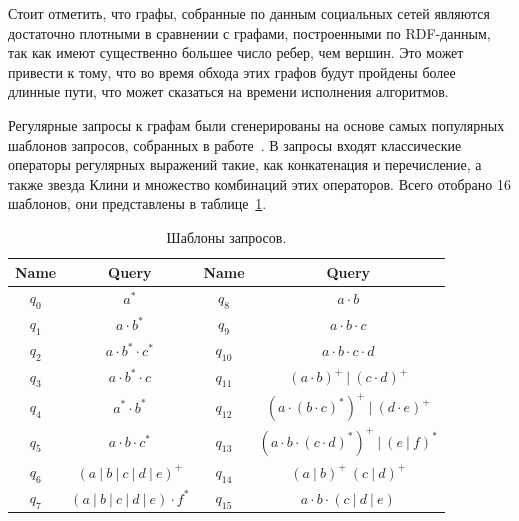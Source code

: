 Стоит отметить, что графы, собранные по данным социальных сетей являются достаточно плотными в сравнении с графами, построенными по RDF-данным, так как имеют существенно большее число ребер, чем вершин. Это может привести к тому, что во время обхода этих графов будут пройдены более длинные пути, что может сказаться на времени исполнения алгоритмов.

Регулярные запросы к графам были сгенерированы на основе самых популярных шаблонов запросов, собранных в  работе~\cite{related_oneforall}. В запросы входят классические операторы регулярных выражений такие, как конкатенация и перечисление, а также звезда Клини и множество комбинаций этих операторов. Всего отобрано 16 шаблонов, они представлены в таблице~\ref{table:queries}.

\begin{table}[!ht]
    \centering
    \begin{tabular}{|c|c||c|c|}
        \hline
        Name  & Query                           & Name     & Query                                           \\ \hline \hline
        $q_0$ & $a^*$                           & $q_{8}$  & $a \cdot b$                                     \\
        $q_1$ & $a \cdot b^*$                   & $q_{9}$  & $a \cdot b \cdot c$                             \\
        $q_2$ & $a \cdot b^* \cdot c^*$         & $q_{10}$ & $a \cdot b \cdot c \cdot d$                     \\
        $q_3$ & $a \cdot b^* \cdot c$           & $q_{11}$ & $(a \cdot b)^+~|~(c \cdot d)^+$                 \\
        $q_4$ & $a^* \cdot b^*$                 & $q_{12}$ & $(a \cdot (b \cdot c)^*)^+~|~(d \cdot e)^+$     \\
        $q_5$ & $a \cdot b \cdot c^*$           & $q_{13}$ & $(a \cdot b \cdot (c \cdot d)^*)^+~|~(e~|~f)^*$ \\
        $q_6$ & $(a~|~b~|~c~|~d~|~e)^+$         & $q_{14}$ & $(a~|~b)^+~(c~|~d)^+$                           \\
        $q_7$ & $(a~|~b~|~c~|~d~|~e) \cdot f^*$ & $q_{15}$ & $a \cdot b \cdot (c~|~d~|~e)$                   \\
        \hline
    \end{tabular}
    \caption{Шаблоны запросов.}\label{table:queries}
\end{table}

